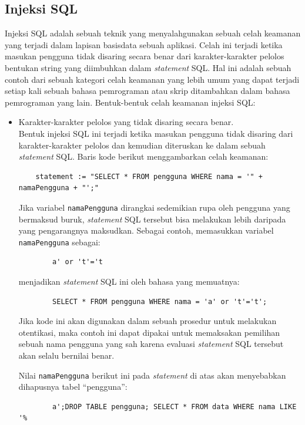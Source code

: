 \subsection{Injeksi SQL}
Injeksi SQL \cite{injeksi-sql} adalah sebuah teknik yang menyalahgunakan sebuah celah keamanan yang terjadi dalam lapisan basisdata sebuah aplikasi. Celah ini terjadi ketika masukan pengguna tidak disaring secara benar dari karakter-karakter pelolos bentukan string yang diimbuhkan dalam \textit{statement} SQL. Hal ini adalah sebuah contoh dari sebuah kategori celah keamanan yang lebih umum yang dapat terjadi setiap kali sebuah bahasa pemrograman atau skrip ditambahkan dalam bahasa pemrograman yang lain. Bentuk-bentuk celah keamanan injeksi SQL:
\begin{itemize}
	\item Karakter-karakter pelolos yang tidak disaring secara benar.\\
	Bentuk injeksi SQL ini terjadi ketika masukan pengguna tidak disaring dari karakter-karakter pelolos dan kemudian diteruskan ke dalam sebuah \textit{statement} SQL. Baris kode berikut menggambarkan celah keamanan:
	\begin{lstlisting}
	statement := "SELECT * FROM pengguna WHERE nama = '" + namaPengguna + "';"
\end{lstlisting}
	
	Jika variabel \verb!namaPengguna! dirangkai sedemikian rupa oleh pengguna yang bermaksud buruk, \textit{statement} SQL tersebut bisa melakukan lebih daripada yang pengarangnya maksudkan. Sebagai contoh, memasukkan variabel \verb!namaPengguna! sebagai:
	\begin{lstlisting}
		a' or 't'='t
	\end{lstlisting}
	menjadikan \textit{statement} SQL ini oleh bahasa yang memuatnya:
	\begin{lstlisting}
		SELECT * FROM pengguna WHERE nama = 'a' or 't'='t';
	\end{lstlisting}
	Jika kode ini akan digunakan dalam sebuah prosedur untuk melakukan otentikasi, maka contoh ini dapat dipakai untuk memaksakan pemilihan sebuah nama pengguna yang sah karena evaluasi \textit{statement} SQL tersebut akan selalu bernilai benar.
	
	 Nilai \verb!namaPengguna! berikut ini pada \textit{statement} di atas akan menyebabkan dihapusnya tabel ``pengguna'':
	 
	\begin{lstlisting}
		a';DROP TABLE pengguna; SELECT * FROM data WHERE nama LIKE '%
	\end{lstlisting}
	

\end{itemize}
